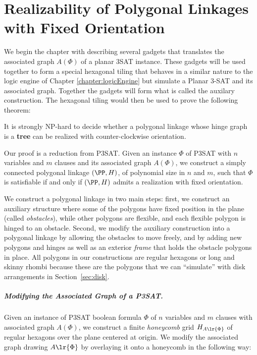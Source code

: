 \chapter{Realizability of Polygonal Linkages with Fixed Orientation\label{chapter:polygonalLinkage}}

We begin the chapter with describing several gadgets that translates the associated graph $A(\Phi)$ of a planar 3SAT instance.  
These gadgets will be used together to form a special hexagonal tiling that behaves in a similar nature to the logic engine of Chapter \ref{chapter:logicEngine} but simulate a Planar 3-SAT and its associated graph.
Together the gadgets will form what is called the auxilary construction.
The hexagonal tiling would then be used to prove the following theorem:
\begin{thm}\label{thm:hinge2}
It is strongly NP-hard to decide whether a polygonal linkage whose hinge graph is a \textbf{tree} can be realized with counter-clockwise orientation.
\end{thm}
Our proof is a reduction from P3SAT.
Given an instance $\Phi$ of P3SAT with $n$ variables and $m$ clauses and its associated graph $A(\Phi)$, we construct a simply connected polygonal linkage $(\PP,H)$, of polynomial size in $n$ and $m$, such that $\Phi$ is satisfiable if and only if $(\PP,H)$ admits a realization with fixed orientation. 

We construct a polygonal linkage  in two main steps: first, we construct an auxiliary structure where some of the polygons have fixed position in the plane (called \emph{obstacles}), while other polygons are flexible, and each flexible polygon is hinged to an obstacle. 
Second, we modify the auxiliary construction into a polygonal linkage by allowing the obstacles to move freely, and by adding new polygons and hinges as well as an exterior \emph{frame} that holds the obstacle polygons in place.
All polygons in our constructions are regular hexagons or long and skinny rhombi because these are the polygons that we can ``simulate'' with disk arrangements in Section~\ref{sec:disk}.
\paragraph{Modifying the Associated Graph of a P3SAT.}

Given an instance of P3SAT boolean formula $\Phi$ of $n$ variables and $m$ clauses with associated graph $A(\Phi)$, we construct a finite \textit{honeycomb} grid $H_{A \lr{\Phi}}$ of regular hexagons over the plane centered at origin.
We modify the associated graph drawing $A\lr{\Phi}$ by overlaying it onto a honeycomb in the following way:

